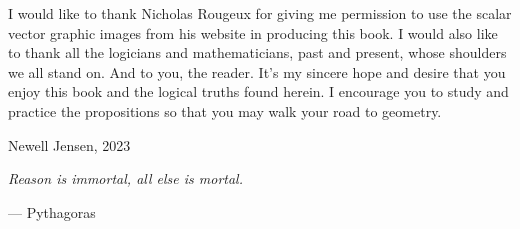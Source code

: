 \documentclass[twoside,11pt]{report}
\begin{document}
I would like to thank Nicholas Rougeux for giving me permission to use the scalar vector graphic images from his website in producing this book.  I would also like to thank all the logicians and mathematicians, past and present, whose shoulders we all stand on.  And to you, the reader.  It's my sincere hope and desire that you enjoy this book and the logical truths found herein.  I encourage you to study and practice the propositions so that you may walk your {\color{cred}{o}}{\color{cblue}{w}}{\color{cyellow}{n}} road to geometry.

\hfill

\begin{flushright}
  Newell Jensen, 2023
\end{flushright}

\newpage

\vspace*{\fill}

\begin{center}
  \textit{Reason is immortal, all else is mortal.}

  \hspace{11em}--- Pythagoras
\end{center}

\vspace*{\fill}

\newpage


\newpage


% 

% 
% 
% 
% 
% 


\end{document}
